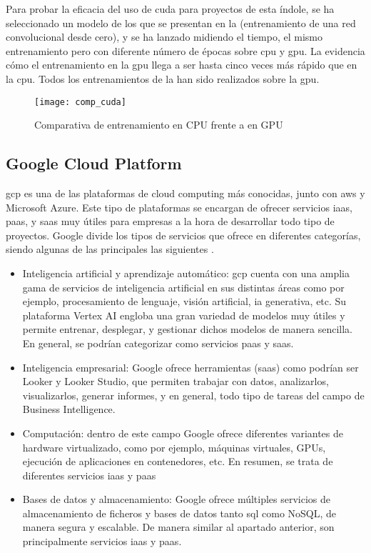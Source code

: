 			Para probar la eficacia del uso de \gls{cuda} para proyectos de esta índole, se ha seleccionado un modelo de los que se presentan en la  (entrenamiento de una red convolucional desde cero), y se ha lanzado midiendo el tiempo, el mismo entrenamiento pero con diferente número de épocas sobre \gls{cpu} y \gls{gpu}. La  evidencia cómo el entrenamiento en la \gls{gpu} llega a ser hasta cinco veces más rápido que en la \gls{cpu}. Todos los entrenamientos de la  han sido realizados sobre la \gls{gpu}. 
			
			\begin{figure}[!h]
				\centering
				\texttt{[image: comp\_cuda]}
				\caption{Comparativa de entrenamiento en CPU frente a en GPU}
				\label{fig:comparativa_cuda}
			\end{figure}
			
		\subsection{Google Cloud Platform}
		
			\gls{gcp} es una de las plataformas de cloud computing más conocidas, junto con \gls{aws} y Microsoft Azure. Este tipo de plataformas se encargan de ofrecer servicios \gls{iaas}, \gls{paas}, y \gls{saas} muy útiles para empresas a la hora de desarrollar todo tipo de proyectos. Google divide los tipos de servicios que ofrece en diferentes categorías, siendo algunas de las principales las siguientes \cite{gcp}.  
			
			\begin{itemize}
				\item Inteligencia artificial y aprendizaje automático: \gls{gcp} cuenta con una amplia gama de servicios de inteligencia artificial en sus distintas áreas como por ejemplo, procesamiento de lenguaje, visión artificial, \gls{ia} generativa, etc. Su plataforma Vertex AI engloba una gran variedad de modelos muy útiles y permite entrenar, desplegar, y gestionar dichos modelos de manera sencilla. En general, se podrían categorizar como servicios \gls{paas} y \gls{saas}. 
				\item Inteligencia empresarial: Google ofrece herramientas (\gls{saas}) como podrían ser Looker y Looker Studio, que permiten trabajar con datos, analizarlos, visualizarlos, generar informes, y en general, todo tipo de tareas del campo de Business Intelligence. 
				\item Computación: dentro de este campo Google ofrece diferentes variantes de hardware virtualizado, como por ejemplo, máquinas virtuales, GPUs, ejecución de aplicaciones en contenedores, etc. En resumen, se trata de diferentes servicios \gls{iaas} y \gls{paas}
				\item Bases de datos y almacenamiento: Google ofrece múltiples servicios de almacenamiento de ficheros y bases de datos tanto \gls{sql} como NoSQL, de manera segura y escalable. De manera similar al apartado anterior, son principalmente servicios \gls{iaas} y \gls{paas}. 
			\end{itemize}
			
